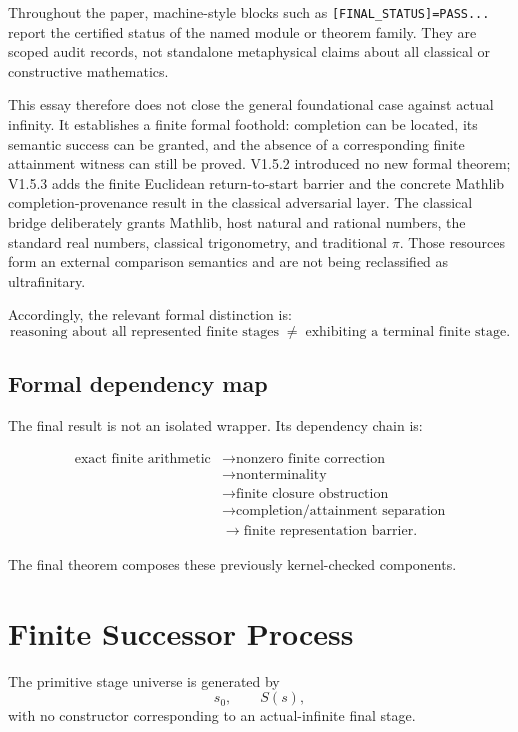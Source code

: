 \documentclass[11pt,a4paper]{article}
\begin{document}
Throughout the paper, machine-style blocks such as
\texttt{[FINAL\_STATUS]=PASS...} report the certified status of the
named module or theorem family.  They are scoped audit records, not
standalone metaphysical claims about all classical or constructive
mathematics.

This essay therefore does not close the general foundational case
against actual infinity.  It establishes a finite formal foothold:
completion can be located, its semantic success can be granted, and
the absence of a corresponding finite attainment witness can still be
proved.  V1.5.2 introduced no new formal theorem; V1.5.3 adds the
finite Euclidean return-to-start barrier and the concrete Mathlib
completion-provenance result in the classical adversarial layer. The classical bridge deliberately grants Mathlib, host natural and rational numbers, the standard real numbers, classical trigonometry, and traditional \(\pi\). Those resources form an external comparison semantics and are not being reclassified as ultrafinitary.

Accordingly, the relevant formal distinction is:
\[
\boxed{\text{reasoning about all represented finite stages}
\;\neq\;
\text{exhibiting a terminal finite stage}.}
\]
\subsection{Formal dependency map}

The final result is not an isolated wrapper. Its dependency chain is:

\[
\begin{aligned}
\text{exact finite arithmetic}
&\longrightarrow
\text{nonzero finite correction}
\\
&\longrightarrow
\text{nonterminality}
\\
&\longrightarrow
\text{finite closure obstruction}
\\
&\longrightarrow
\text{completion/attainment separation}
\\
&\longrightarrow
\text{finite representation barrier}.
\end{aligned}
\]

The final theorem composes these previously kernel-checked components.

\section{Finite Successor Process}

The primitive stage universe is generated by
\[
s_0,\qquad S(s),
\]
with no constructor corresponding to an actual-infinite final stage.
\end{document}
